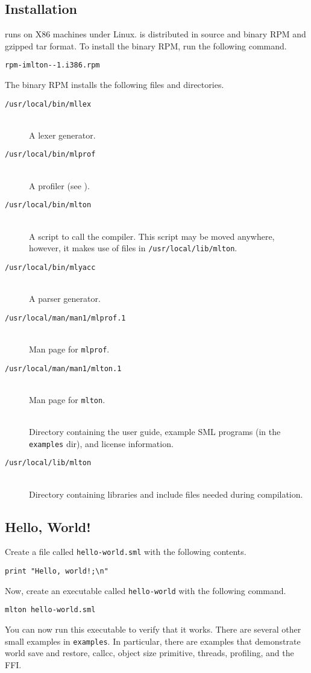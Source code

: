 
\subsection{Installation}

{\mlton} runs on X86 machines under Linux.  {\mlton} is distributed in source
and binary RPM and gzipped tar format.  To install the binary RPM, run the
following command.
\begin{alltt}
rpm -i mlton-\version-1.i386.rpm
\end{alltt}
The binary RPM installs the following files and directories.

\newcommand{\place}[1]{\item[\tt #1]\hspace{1in}\\}

\begin{description}

\place{/usr/local/bin/mllex}
A lexer generator.

\place{/usr/local/bin/mlprof}
A profiler (see ).

\place{/usr/local/bin/mlton}
A script to call the compiler.
This script may be moved anywhere, however,
it makes use of files in {\tt /usr/local/lib/mlton}.

\place{/usr/local/bin/mlyacc}
A parser generator.

\place{/usr/local/man/man1/mlprof.1}
Man page for {\tt mlprof}.

\place{/usr/local/man/man1/mlton.1}
Man page for {\tt mlton}.

\place{\doc}
Directory containing the user guide, example SML programs (in the {\tt examples}
dir), and license information.

\place{/usr/local/lib/mlton}
Directory containing libraries and include files needed during
compilation.

\end{description}

\subsection{Hello, World!}

Create a file called {\tt hello-world.sml} with the following contents.

\begin{verbatim}
print "Hello, world!;\n"
\end{verbatim}
Now, create an executable called {\tt hello-world} with the following command.
\begin{verbatim}
mlton hello-world.sml
\end{verbatim}
You can now run this executable to verify that it works.  There are several
other small examples in {\tt examples}.  In particular, there are examples that
demonstrate world save and restore, callcc, object size primitive, threads,
profiling, and the FFI.

